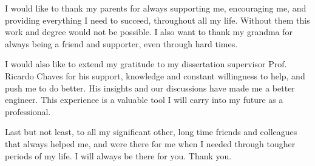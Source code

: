 
I would like to thank my parents for always supporting me, encouraging me, and providing everything I need to succeed, throughout all my life. Without them this work and degree would not be possible. I also want to thank my grandma for always being a friend and supporter, even through hard times.

I would also like to extend my gratitude to my dissertation supervisor Prof. Ricardo Chaves for his support, knowledge and constant willingness to help, and push me to do better. His insights and our discussions have made me a better engineer. This experience is a valuable tool I will carry into my future as a professional.

Last but not least, to all my significant other, long time friends and colleagues that always helped me, and were there for me when I needed through tougher periods of my life. I will always be there for you. Thank you.





